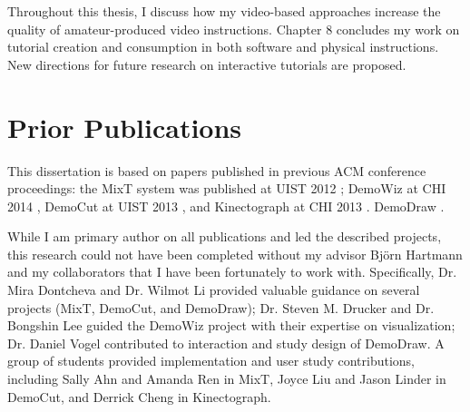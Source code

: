 Throughout this thesis, I discuss how my video-based approaches increase the quality of amateur-produced video instructions. Chapter 8 concludes my work on tutorial creation and consumption in both software and physical instructions. New directions for future research on interactive tutorials are proposed.


\section {Prior Publications}

This dissertation is based on papers published in previous ACM conference proceedings: the MixT system was published at UIST 2012 \cite{Chi:2012:MAG:2380116.2380130}; DemoWiz at CHI 2014 \cite{Chi:2014:DRS:2556288.2557254}, DemoCut at UIST 2013 \cite{Chi:2013:DGC:2501988.2502052}, and Kinectograph at CHI 2013 \cite{Cheng:2013:BCC:2468356.2468568}. DemoDraw .

While I am primary author on all publications and led the described projects, this research could not have been completed without my advisor Bj\"orn Hartmann and my collaborators that I have been fortunately to work with. Specifically, Dr. Mira Dontcheva and Dr. Wilmot Li provided valuable guidance on several projects (MixT, DemoCut, and DemoDraw); Dr. Steven M. Drucker and Dr. Bongshin Lee guided the DemoWiz project with their expertise on visualization; Dr. Daniel Vogel contributed to interaction and study design of DemoDraw. A group of students provided implementation and user study contributions, including Sally Ahn and Amanda Ren in MixT, Joyce Liu and Jason Linder in DemoCut, and Derrick Cheng in Kinectograph.

